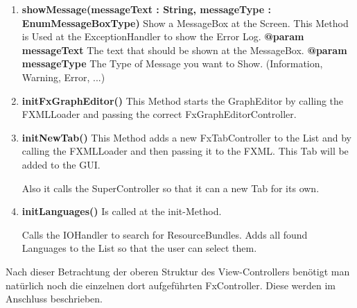 \documentclass{article}
\begin{document}
				\begin{enumerate}[+]
					\item{
						\textbf{showMessage(messageText : String, messageType : EnumMessageBoxType)} \newline
						Show a MessageBox at the Screen.
						This Method is Used at the ExceptionHandler to show the Error Log.
						\newline
						\textbf{@param messageText}
							The text that should be shown at the MessageBox.
							\newline
						\textbf{@param messageType}
							The Type of Message you want to Show.
							(Information, Warning, Error, ...)
							\newline
					}
					\item{
						\textbf{initFxGraphEditor()} \newline
						This Method starts the GraphEditor by calling the FXMLLoader and passing the correct FxGraphEditorController.
						\newline
					}
					\item{
						\textbf{initNewTab()} \newline
						This Method adds a new FxTabController to the List and by calling the FXMLLoader and then passing it to the FXML.
						This Tab will be added to the GUI.
						
						Also it calls the SuperController so that it can a new Tab for its own.
						\newline
					}
					\item{
						\textbf{initLanguages()} \newline
						Is called at the init-Method.
						
						Calls the IOHandler to search for ResourceBundles.
						Adds all found Languages to the List so that the user can select them.
						\newline
					}
				\end{enumerate}
			
			Nach dieser Betrachtung der oberen Struktur des View-Controllers benötigt man natürlich noch die einzelnen dort aufgeführten FxController.
			Diese werden im Anschluss beschrieben.
			
\end{document}
